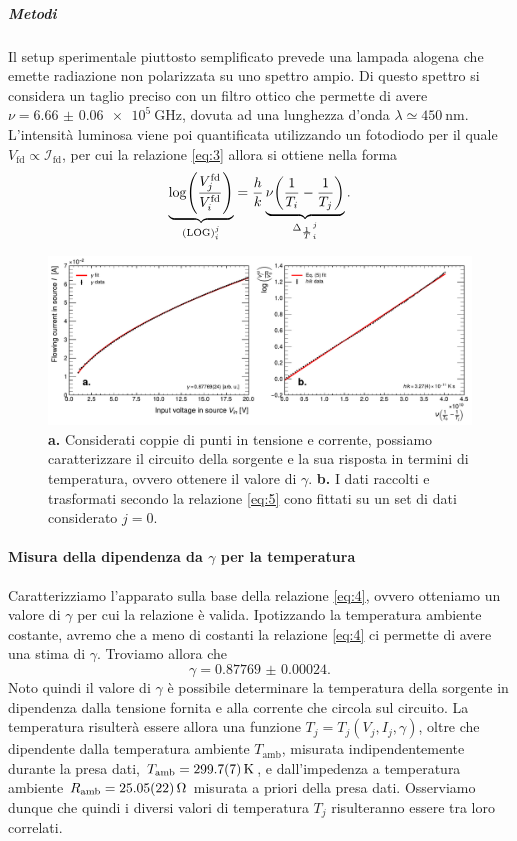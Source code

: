 \documentclass[a4paper, varvw, nofootinbib]{revtex4-2}
\begin{document}
\subparagraph*{Metodi}\label{sec:black_body_methods} Il setup sperimentale piuttosto semplificato prevede una lampada alogena che emette radiazione non polarizzata su uno spettro ampio. Di questo spettro si considera un taglio preciso con un filtro ottico che permette di avere $\nu = \SI{6.66(6)e+5}{\giga\hertz}$, dovuta ad una lunghezza d'onda $\lambda \simeq \SI{450}{\nano\metre}$. L'intensità luminosa viene poi quantificata utilizzando un fotodiodo per il quale $V_\text{fd} \propto \mathcal I_\text{fd}$, per cui la relazione \eqref{eq:3} allora si ottiene nella forma \begin{equation}\underbrace{\log(\frac{V^\text{fd}_j}{V^\text{fd}_i})}_{(\text{LOG})_i^j} = \frac{h}{k}\underbrace{\nu\qty({1\over T_i} - {1\over T_j})}_{{\Delta_{\frac{1}{T}}}_i^j}. \label{eq:5}\end{equation}

\begin{figure}
    \centering
    \includegraphics[width=14cm]{fig/plot_hk}
    \caption{\textbf{a.} Considerati coppie di punti in tensione e corrente, possiamo caratterizzare il circuito della sorgente e la sua risposta in termini di temperatura, ovvero ottenere il valore di $\gamma$. \textbf{b.} I dati raccolti e trasformati secondo la relazione \eqref{eq:5} cono fittati su un set di dati considerato $j=0$.}
\end{figure}

\paragraph*{Misura della dipendenza da $\gamma$ per la temperatura} Caratterizziamo l'apparato sulla base della relazione \eqref{eq:4}, ovvero otteniamo un valore di $\gamma$ per cui la relazione è valida. Ipotizzando la temperatura ambiente costante, avremo che a meno di costanti la relazione \eqref{eq:4} ci permette di avere una stima di $\gamma$. Troviamo allora che \[\gamma = \num{0.87769(24)}.\] Noto quindi il valore di $\gamma$ è possibile determinare la temperatura della sorgente in dipendenza dalla tensione fornita e alla corrente che circola sul circuito. La temperatura risulterà essere allora una funzione $T_j = T_j(V_j, I_j, \gamma)$, oltre che dipendente dalla temperatura ambiente $T_\text{amb}$, misurata indipendentemente durante la presa dati, $T_\text{amb} = \SI{299.7 +- 0.7}{\kelvin}$, e dall'impedenza a temperatura ambiente $R_\text{amb} = \SI{25.045 +- 0.215}{\ohm}$ misurata a priori della presa dati. Osserviamo dunque che quindi i diversi valori di temperatura $T_j$ risulteranno essere tra loro correlati. 
\end{document}
